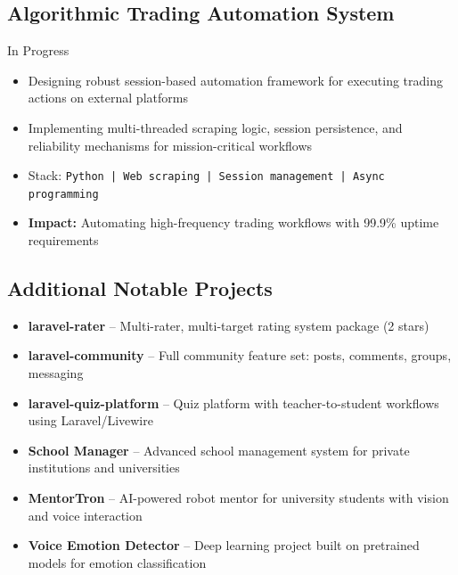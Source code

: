 \documentclass[11pt,a4paper]{article}
\newcommand{\dates}[1]{\hfill{\color{gray}\small #1}}
\newcommand{\tech}[1]{{\color{darkblue}\small\texttt{#1}}}
\begin{document}
\vspace{4pt}

\subsection{Algorithmic Trading Automation System}
\dates{In Progress}

\begin{itemize}
    \item Designing robust session-based automation framework for executing trading actions on external platforms
    \item Implementing multi-threaded scraping logic, session persistence, and reliability mechanisms for mission-critical workflows
    \item Stack: \tech{Python | Web scraping | Session management | Async programming}
    \item \textbf{Impact:} Automating high-frequency trading workflows with 99.9\% uptime requirements
\end{itemize}

\vspace{4pt}

\subsection{Additional Notable Projects}

\begin{itemize}
    \item \textbf{laravel-rater} – Multi-rater, multi-target rating system package (2 stars)
    \item \textbf{laravel-community} – Full community feature set: posts, comments, groups, messaging
    \item \textbf{laravel-quiz-platform} – Quiz platform with teacher-to-student workflows using Laravel/Livewire
    \item \textbf{School Manager} – Advanced school management system for private institutions and universities
    \item \textbf{MentorTron} – AI-powered robot mentor for university students with vision and voice interaction
    \item \textbf{Voice Emotion Detector} – Deep learning project built on pretrained models for emotion classification
\end{itemize}

\newpage

\end{document}
